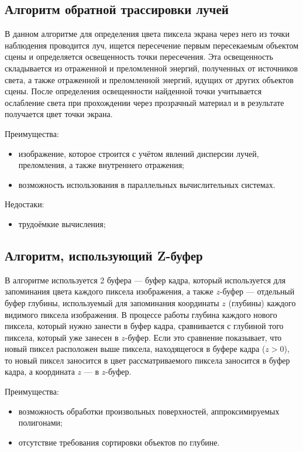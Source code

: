 \subsection{Алгоритм обратной трассировки лучей}

В данном алгоритме для определения цвета пиксела экрана через него из точки
наблюдения проводится луч, ищется пересечение первым пересекаемым объектом
сцены и определяется освещенность точки пересечения. Эта освещенность
складывается из отраженной и преломленной энергий, полученных от источников
света, а также отраженной и преломленной энергий, идущих от других объектов
сцены. После определения освещенности найденной точки учитывается ослабление
света при прохождении через прозрачный материал и в результате получается цвет
точки экрана.

Преимущества:
\begin{itemize}
    \item изображение, которое строится с учётом явлений дисперсии лучей,
        преломления, а также внутреннего отражения;
    \item возможность использования в параллельных вычислительных системах.
\end{itemize}

Недостаки:
\begin{itemize}
    \item трудоёмкие вычисления;
\end{itemize}

\subsection{Алгоритм, использующий Z-буфер}

В алгоритме используется 2 буфера --- буфер кадра, который используется для
запоминания цвета каждого пиксела изображения, а также $z$-буфер --- отдельный
буфер глубины, используемый для запоминания координаты $z$ (глубины) каждого
видимого пиксела изображения. В процессе работы глубина каждого нового пиксела,
который нужно занести в буфер кадра, сравнивается с глубиной того пиксела,
который уже занесен в $z$-буфер. Если это сравнение показывает, что новый
пиксел расположен выше пиксела, находящегося в буфере кадра ($z > 0$), то новый
пиксел заносится в цвет рассматриваемого пиксела заносится в буфер кадра, а
координата $z$ --- в $z$-буфер. 

Преимущества:
\begin{itemize}
    \item возможность обработки произвольных поверхностей, аппроксимируемых
        полигонами;
    \item отсутствие требования сортировки объектов по глубине.
\end{itemize}


